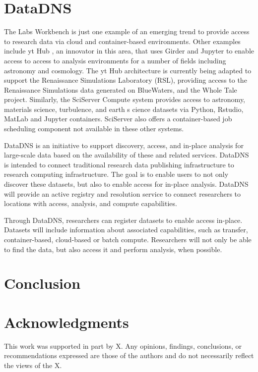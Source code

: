 \documentclass{sig-alternate}
\begin{document}
\section{DataDNS}

The Labs Workbench is just one example of an emerging trend to provide access to research data via cloud and container-based environments.  Other examples include yt Hub \cite{smith2011}, an innovator in this area, that uses Girder and Jupyter to enable access to access to analysis environments for a number of fields including astronomy and cosmology.  The yt Hub architecture is currently being adapted to support the Renaissance Simulations Laboratory (RSL), providing access to the Renaissance Simulations data generated on BlueWaters, and the Whole Tale project.  Similarly, the SciServer Compute system provides access to astronomy, materials science, turbulence, and earth s	cience datasets via Python, Rstudio, MatLab and Jupyter containers.  SciServer also offers a container-based job scheduling component not available in these other systems.

DataDNS is an initiative to support discovery, access, and in-place analysis for large-scale data based on the availability of these and related services. DataDNS is intended to connect traditional research data publishing infrastructure to research computing infrastructure. The goal is to enable users to not only discover these datasets, but also to enable access for in-place analysis. DataDNS will provide an active registry and resolution service to connect researchers to locations with access, analysis, and compute capabilities.  

Through DataDNS, researchers can register datasets to enable access in-place. Datasets will include information about associated capabilities, such as transfer, container-based, cloud-based or batch compute. Researchers will not only be able to find the data, but also access it and perform analysis, when possible.   


\section{Conclusion}




\section{Acknowledgments}
This work was supported in part by X. Any opinions, findings, conclusions, or recommendations expressed are those of the authors and do not necessarily reflect the views of the X.


  
\end{document}
